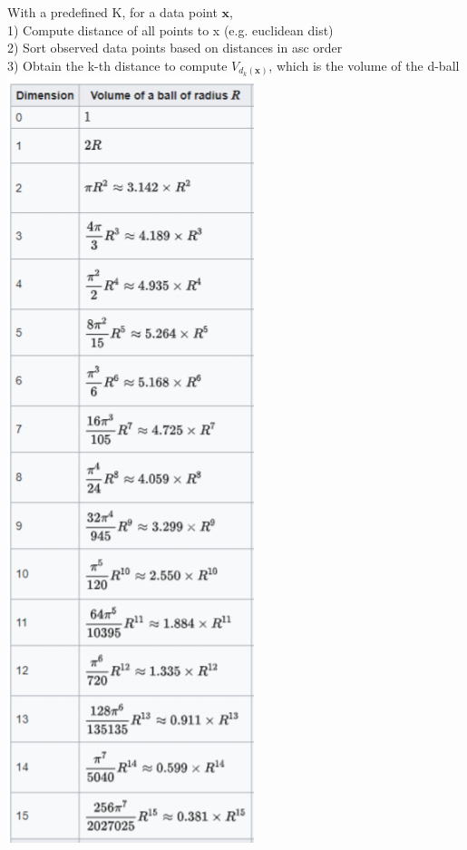 With a predefined K, for a data point $\mathbf{x}$,\\
1) Compute distance of all points to x (e.g. euclidean dist)\\
2) Sort observed data points based on distances in asc order\\
3) Obtain the k-th distance to compute $V_{d_k(\mathbf{x})}$, which is the volume 
of the d-ball\\
\includegraphics[width=\linewidth]{fig/knnestimator.PNG}
